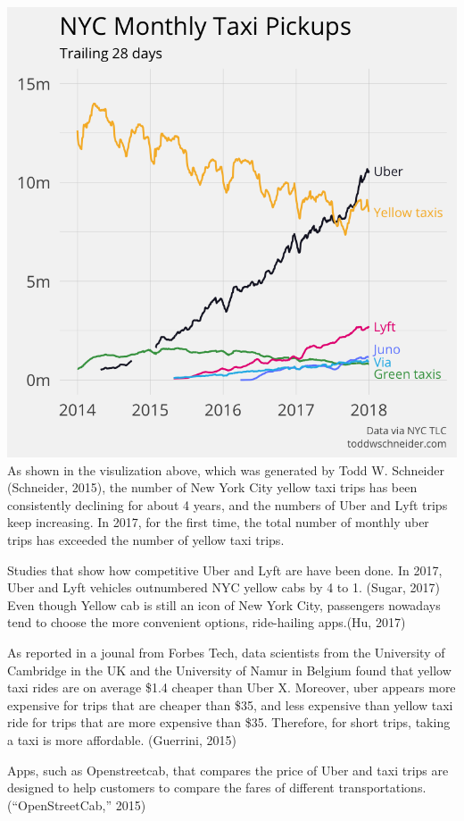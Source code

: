 \documentclass[12pt,twoside]{reedthesis}
\theoremstyle{definition}
\theoremstyle{definition}
\theoremstyle{definition}
\theoremstyle{remark}
\begin{document}
\includegraphics{figure/totals_by_car_type.png} As shown in the
visulization above, which was generated by Todd W. Schneider (Schneider,
2015), the number of New York City yellow taxi trips has been
consistently declining for about 4 years, and the numbers of Uber and
Lyft trips keep increasing. In 2017, for the first time, the total
number of monthly uber trips has exceeded the number of yellow taxi
trips.

Studies that show how competitive Uber and Lyft are have been done. In
2017, Uber and Lyft vehicles outnumbered NYC yellow cabs by 4 to 1.
(Sugar, 2017) Even though Yellow cab is still an icon of New York City,
passengers nowadays tend to choose the more convenient options,
ride-hailing apps.(Hu, 2017)

As reported in a jounal from Forbes Tech, data scientists from the
University of Cambridge in the UK and the University of Namur in Belgium
found that yellow taxi rides are on average \$1.4 cheaper than Uber X.
Moreover, uber appears more expensive for trips that are cheaper than
\$35, and less expensive than yellow taxi ride for trips that are more
expensive than \$35. Therefore, for short trips, taking a taxi is more
affordable. (Guerrini, 2015)

Apps, such as Openstreetcab, that compares the price of Uber and taxi
trips are designed to help customers to compare the fares of different
transportations. (``OpenStreetCab,'' 2015)
\end{document}

